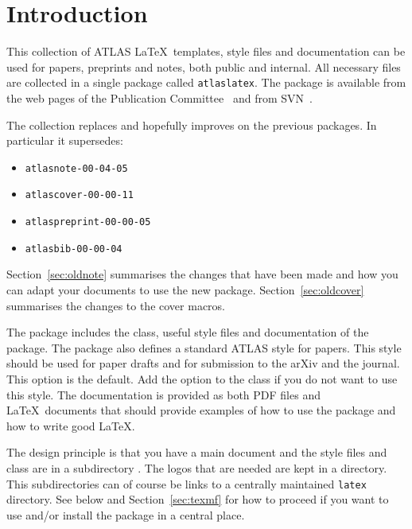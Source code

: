 
\section{Introduction}
\label{sec:intro}

This collection of ATLAS \LaTeX\ templates, style files and documentation
can be used for papers, preprints and notes, both public and internal. 
All necessary files are collected in a single package called \texttt{atlaslatex}.
The package is available from the web pages of the Publication Committee~\cite{pubcom} and from 
SVN~\cite{pubcom-svn}.

The collection replaces and hopefully improves on the previous packages. 
In particular it supersedes:
\begin{itemize}\setlength{\parskip}{0pt}\setlength{\itemsep}{0pt}
\item \texttt{atlasnote-00-04-05}
\item \texttt{atlascover-00-00-11}
\item \texttt{atlaspreprint-00-00-05}
\item \texttt{atlasbib-00-00-04}
\end{itemize}
Section~\ref{sec:oldnote} summarises the changes that have been made and
how you can adapt your documents to use the new package.
Section~\ref{sec:oldcover} summarises the changes to the cover macros.

The package includes the  class, useful style files
and documentation of the package.
The package also defines a standard ATLAS style for papers.
This style should be used for paper drafts and for submission to the arXiv and the journal.
This option is the default. Add the option  to the  class if you do not want to use this style.
The documentation is provided as both PDF files and \LaTeX\ documents
that should provide examples of how to use the package and how to write
good \LaTeX.

The design principle is that you have a main document and 
the style files and  class are in a subdirectory .
The logos that are needed are kept in a  directory.
This subdirectories can of course be links to a centrally maintained \texttt{latex} directory.
See below and Section~\ref{sec:texmf} for how to proceed if you want to use and/or install
the package in a central place.

